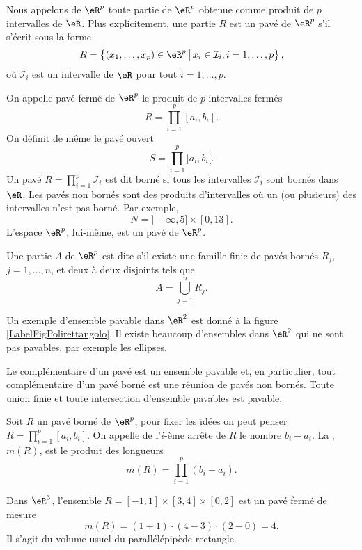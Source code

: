\begin{definition}
 Nous appelons  de $\eR^p$ toute partie de $\eR^p$ obtenue comme produit de $p$ intervalles de $\eR$. Plus explicitement, une partie $R$ est un pavé de $\eR^p$ s'il s'écrit sous la forme
\[
R=\left\{(x_1,\ldots, x_p)\in\eR^p \,\big\vert\,x_i\in \mathcal{I}_i,  i=1,\ldots, p  \right\},
\]
où $\mathcal{I}_i$ est un intervalle de $\eR$ pour tout $i=1,\ldots, p$. 
\end{definition}
On appelle pavé fermé de $\eR^p$ le produit de $p$ intervalles fermés 
\[
R=\prod_{i=1}^{p}[a_i,b_i].
\]
On définit de même le pavé ouvert 
\[
S=\prod_{i=1}^{p}]a_i,b_i[.
\]
Un pavé $ R=\prod_{i=1}^{p}\mathcal{I}_i$ est dit borné si tous les intervalles $\mathcal{I}_i$ sont bornés dans $\eR$. Les pavés non bornés sont des produits d'intervalles où un (ou plusieurs) des intervalles n'est pas borné. Par exemple,
\[
N=]-\infty, 5]\times [0,13].
\]
L'espace $\eR^p$, lui-même, est un pavé de $\eR^p$. 
\begin{definition}
  Une partie $A$ de $\eR^p$ est dite   s'il existe une famille finie de pavés bornés $R_j$, $j=1,\ldots, n$, et deux à deux disjoints tels que 
\[
A=\bigcup_{j=1}^{n}R_j.
\] 
\end{definition}
Un exemple d'ensemble pavable dans $\eR^2$ est donné à la figure \ref{LabelFigPolirettangolo}. Il existe beaucoup d'ensembles dans $\eR^2$ qui ne sont pas pavables, par exemple les ellipses.
\newcommand{\CaptionFigPolirettangolo}{Un ensemble pavable.}


Le complémentaire d'un pavé est  un ensemble pavable et, en particulier, tout complémentaire d'un pavé borné est une réunion de  pavés non bornés. Toute union finie et toute intersection d'ensemble pavables est pavable.    
\begin{definition}
	Soit $R$ un pavé borné de $\eR^p$, pour fixer les idées on peut penser $R=\prod_{i=1}^{p}[a_i,b_i]$. On appelle  de l'$i$-ème arrête de $R$ le nombre $b_i-a_i$. La , $m(R)$, est le produit des longueurs 
\[
m(R)=\prod_{i=1}^{p}(b_i-a_i).
\] 
\end{definition}
\begin{example}
  Dans $\eR^3$, l'ensemble $R=[-1,1]\times[3,4]\times[0,2]$ est un pavé fermé de mesure 
\[
m(R)= (1+1)\cdot(4-3)\cdot(2-0)=4.
\] 
Il s'agit du volume usuel du parallélépipède rectangle.
\end{example}

